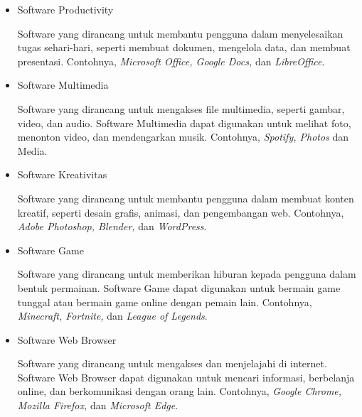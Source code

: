 \documentclass[12pt]{article}
\begin{document}
\begin{itemize}
\begin{enumerate}
\begin{itemize}
                \item Software Productivity
                \par
                Software yang dirancang untuk membantu pengguna dalam menyelesaikan tugas sehari-hari, seperti membuat dokumen, mengelola data, dan membuat presentasi. Contohnya, \textit{Microsoft Office, Google Docs,} dan \textit{LibreOffice}.
                \item Software Multimedia
                \par
                Software yang dirancang untuk mengakses file multimedia, seperti gambar, video, dan audio. Software Multimedia dapat digunakan untuk melihat foto, menonton video, dan mendengarkan musik. Contohnya, \textit{Spotify, Photos} dan Media.
                \item Software Kreativitas
                \par
                Software yang dirancang untuk membantu pengguna dalam membuat konten kreatif, seperti desain grafis, animasi, dan pengembangan web. Contohnya, \textit{Adobe Photoshop, Blender,} dan \textit{WordPress}.
                \item Software Game
                \par
                Software yang dirancang untuk memberikan hiburan kepada pengguna dalam bentuk permainan. Software Game dapat digunakan untuk bermain game tunggal atau bermain game online dengan pemain lain. Contohnya, \textit{Minecraft, Fortnite,} dan \textit{League of Legends}.
                \item Software Web Browser
                \par
                Software yang dirancang untuk mengakses dan menjelajahi di internet. Software Web Browser dapat digunakan untuk mencari informasi, berbelanja online, dan berkomunikasi dengan orang lain. Contohnya, \textit{Google Chrome, Mozilla Firefox,} dan \textit{Microsoft Edge}.
            \end{itemize}
        \end{enumerate}


\end{itemize}
\end{document}
